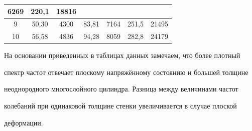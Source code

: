 \begin{table}[htbp]
\begin{tabular}{c|c|c|c|c|c|c}
6269& 

220,1& 

18816 \\

\hline

9& 

50,30& 

4300& 

83,81& 

7164& 

251,5& 

21495 \\

\hline

10& 

56,58& 

4836& 

94,28& 

8059& 

282,8& 

24179 \\

\hline

\end{tabular}

\label{epishkin:tab2}



\end{table}



На основании приведенных в таблицах данных замечаем, что более плотный 

спектр частот отвечает плоскому напряжённому состоянию и большей толщине 

неоднородного многослойного цилиндра. Разница между величинами частот 

колебаний при одинаковой толщине стенки увеличивается в случае плоской 

деформации.



\newpage







